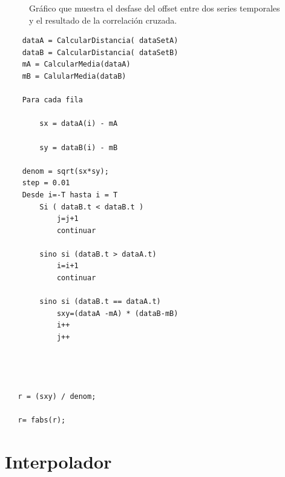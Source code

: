 \begin{figure}[H]
\begin{center}
\hspace{0.5cm}

\end{center}

\caption{Gráfico que muestra el desfase del offset entre dos series temporales y el resultado de la correlación cruzada.}
\end{figure}
	                                
	\begin{lstlisting}
	dataA = CalcularDistancia( dataSetA)
	dataB = CalcularDistancia( dataSetB)
	mA = CalcularMedia(dataA)
	mB = CalularMedia(dataB)

	Para cada fila

   		sx = dataA(i) - mA

   		sy = dataB(i) - mB

   	denom = sqrt(sx*sy);
   	step = 0.01
   	Desde i=-T hasta i = T
   		Si ( dataB.t < dataB.t )
			j=j+1
    		continuar

    	sino si (dataB.t > dataA.t)
    		i=i+1
    		continuar

    	sino si (dataB.t == dataA.t)
    		sxy=(dataA -mA) * (dataB-mB)
        	i++
        	j++


   

   r = (sxy) / denom;

   r= fabs(r);
    \end{lstlisting}



\section{Interpolador}

